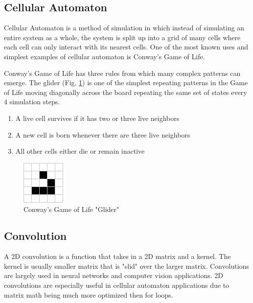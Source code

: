 \documentclass[ aps, pra, reprint, notitlepage ]{revtex4-1}
\begin{document}

\subsection{\label{CellularAutomaton} Cellular Automaton}

Cellular Automaton is a method of simulation in which instead of simulating an entire system as a whole, the system is split up into a grid of many cells where each cell can only interact with its nearest cells. One of the most known uses and simplest examples of cellular automaton is Conway's Game of Life.

Conway's Game of Life has three rules from which many complex patterns can emerge.\cite{ConwayGoL} The glider (Fig. \ref{Glider}) is one of the simplest repeating patterns in the Game of Life moving diagonally across the board repeating the same set of states every 4 simulation steps.
\begin{enumerate}
	\item A live cell survives if it has two or three live neighbors
	\item A new cell is born whenever there are three live neighbors
	\item All other cells either die or remain inactive
\end{enumerate}

\begin{figure}[ht]
	\includegraphics[scale=0.75]{Pictures/Glider}
	\caption{\label{Glider}Conway's Game of Life "Glider"}
\end{figure}

\subsection{\label{Convolution} Convolution}

A 2D convolution is a function that takes in a 2D matrix and a kernel. The kernel is usually smaller matrix that is "slid" over the larger matrix. Convolutions are largely used in neural networks and computer vision applications. 2D convolutions are especially useful in cellular automaton applications due to matrix math being much more optimized then for loops.
\end{document}
